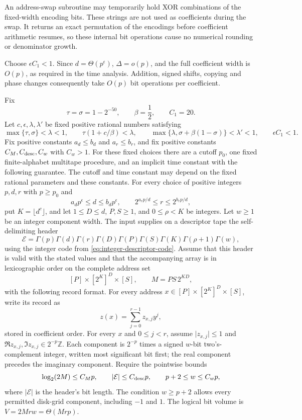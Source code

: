 An address-swap subroutine may temporarily hold XOR combinations of
the fixed-width encoding bits.  These strings are not used as
coefficients during the swap.  It returns an exact permutation of
the encodings before coefficient arithmetic resumes, so these
internal bit operations cause no numerical rounding or denominator
growth.

Choose \(\epsilon C_1<1\).  Since \(d=\Theta(p^\epsilon)\),
\(\Delta=o(p)\), and the full coefficient width is \(O(p)\), as
required in the time analysis.  Addition, signed shifts, copying and
phase changes consequently take \(O(p)\) bit operations per
coefficient.

\begin{proposition}
\label{prop:simultaneous-layer}
Fix
\[
 \tau=\sigma=1-2^{-50},\qquad \beta=\frac12,\qquad C_1=20.
\]
Let $c,\epsilon,\lambda,\lambda'$ be fixed positive rational numbers
satisfying
\[
 \max\{\tau,\sigma\}<\lambda<1,\qquad
 \tau(1+c/\beta)<\lambda,\qquad
 \max\{\lambda,\sigma+\beta(1-\sigma)\}<\lambda'<1,
 \qquad \epsilon C_1<1.
\]
Fix positive constants $a_d\le b_d$ and $a_r\le b_r$, and fix
positive constants $C_M,C_{\rm desc},C_w$ with $C_w>1$.
For these fixed choices
there are a cutoff $p_0$, one fixed finite-alphabet multitape procedure,
and an implicit time constant with the following guarantee. The cutoff
and time constant may depend on the fixed rational parameters
and these constants. For every choice of positive integers $p,d,r$
with $p\ge p_0$ and
\[
 a_dp^\epsilon\le d\le b_dp^\epsilon,\qquad
 2^{a_rp/d}\le r\le 2^{b_rp/d},
\]
put $K=\lfloor d^c\rfloor$, and let $1\le D\le d$, $P,S\ge1$, and
$0\le\rho<K$ be integers. Let $w\ge1$ be an integer component width.
The input supplies on a descriptor tape
the self-delimiting header
\[
 \mathcal E=
 \Gamma(p)\Gamma(d)\Gamma(r)\Gamma(D)\Gamma(P)\Gamma(S)
 \Gamma(K)\Gamma(\rho+1)\Gamma(w),
\]
using the integer code from
\eqref{eq:integer-descriptor-code}. Assume that this header
is valid with the stated values and that the accompanying array is
in lexicographic order on the complete address set
\[
 [P]\times[2^K]^D\times[S],
 \qquad M=PS\,2^{KD},
\]
with the following record format. For every address
$x\in[P]\times[2^K]^D\times[S]$, write its record as
\[
 z(x)=\sum_{j=0}^{r-1}z_{x,j}y^j,
\]
stored in coefficient order. For every $x$ and $0\le j<r$, assume
$\lvert z_{x,j}\rvert\le1$ and
$\Re z_{x,j},\Im z_{x,j}\in2^{-p}\mathbb Z$.
Each component is $2^{-p}$ times a signed $w$-bit two's-complement
integer, written most significant bit first; the real component
precedes the imaginary component. Require the pointwise bounds
\[
 \log_2(2M)\le C_Mp,\qquad
 |\mathcal E|\le C_{\rm desc}p,\qquad
 p+2\le w\le C_wp,
\]
where $|\mathcal E|$ is the header's bit length. The condition
$w\ge p+2$ allows every permitted disk-grid component, including
$-1$ and $1$. The logical bit volume is $V=2Mrw=\Theta(Mrp)$.


\end{proposition}
